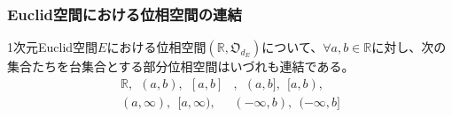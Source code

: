 \documentclass[dvipdfmx]{jsarticle}
\begin{document}
\subsubsection{Euclid空間における位相空間の連結}%
\begin{thm}\label{8.2.2.11}
1次元Euclid空間$E$における位相空間$\left( \mathbb{R},\mathfrak{O}_{d_{E}} \right)$について、$\forall a,b \in \mathbb{R}$に対し、次の集合たちを台集合とする部分位相空間はいづれも連結である。
\begin{align*}
\mathbb{R},\ \ (a,b),\ \ [ a,b]&,\ \ (a,b],\ \ [ a,b), \\ 
(a,\infty),\ \ [ a,\infty),\ \ &( - \infty,b),\ \ ( - \infty,b]
\end{align*}
\end{thm}
\end{document}
